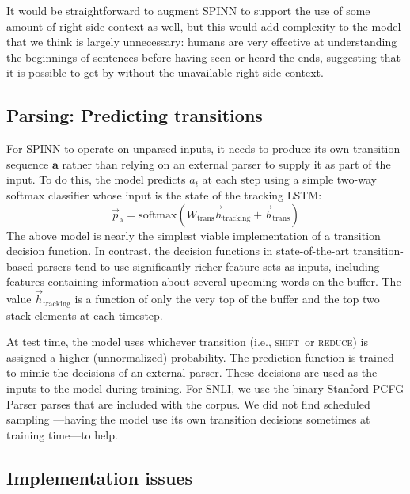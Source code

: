 \documentclass[11pt]{article}
\newcommand{\shift}{\textsc{shift}}
\newcommand{\reduce}{\textsc{reduce}}
\begin{document}
It would be straightforward to augment SPINN to support the use of some amount of right-side context as well, but this would add complexity to the model that we think is largely unnecessary: humans are very effective at understanding the beginnings of sentences before having seen or heard the ends, suggesting that it is possible to get by without the unavailable right-side context.

\subsection{Parsing: Predicting transitions}

For SPINN to operate on unparsed inputs, it needs to produce its own transition sequence $\mathbf a$ rather than relying on an external parser to supply it as part of the input. To do this, the model predicts $a_t$ at each step using a simple two-way softmax classifier whose input is the state of the tracking LSTM:
\begin{equation}
\vec{p}_{\text{a}} = \text{softmax}(W_{\text{trans}}\vec{h}_{\text{tracking}} + \vec{b}_{\text{trans}})
\end{equation}
The above model is nearly the simplest viable implementation of a transition decision function. In contrast, the decision functions in state-of-the-art transition-based parsers tend to use significantly richer feature sets as inputs, including features containing information about several upcoming words on the buffer. The value $\vec{h}_{\text{tracking}}$ is a function of only the very top of the buffer and the top two stack elements at each timestep.

At test time, the model uses whichever transition (i.e., \shift\ or \reduce) is assigned a higher (unnormalized) probability. The prediction function is trained to mimic the decisions of an external parser. These decisions are used as the inputs to the model during training. For SNLI, we use the binary Stanford PCFG Parser parses that are included with the corpus. We did not find scheduled sampling \citep{bengio2015scheduled}---having the model use its own transition decisions sometimes at training time---to help.

\subsection{Implementation issues}
\end{document}
